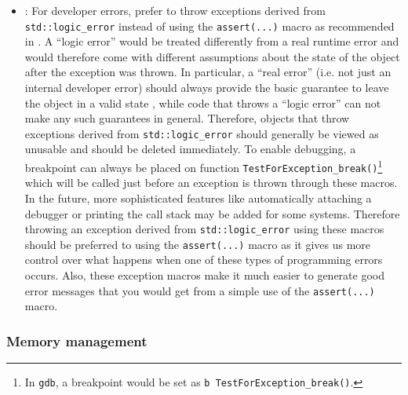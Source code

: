 \begin{itemize}

{}\item\GCGTestForException: For developer errors, prefer to throw exceptions
derived from {}\texttt{std\-::logic\-\_error} instead of using the
{}\texttt{assert(...)}  macro as recommended in {}\cite[Item
68]{C++CodingStandards05}.  A ``logic error'' would be treated differently
from a real runtime error and would therefore come with different assumptions
about the state of the object after the exception was thrown.  In particular,
a ``real error'' (i.e. not just an internal developer error) should always
provide the basic guarantee to leave the object in a valid state {}\cite[Item
71]{C++CodingStandards05}, while code that throws a ``logic error'' can not
make any such guarantees in general.  Therefore, objects that throw exceptions
derived from {}\texttt{std\-::logic\-\_error} should generally be viewed as
unusable and should be deleted immediately.  To enable debugging, a breakpoint
can always be placed on function
{}\texttt{Test\-For\-Exception\-\_break()}\footnote{In {}\texttt{gdb}, a
breakpoint would be set as {}\texttt{b Test\-For\-Exception\-\_break()}.} 
which will be called just before an exception is thrown through these macros.
In the future, more sophisticated features like automatically attaching a
debugger or printing the call stack may be added for some systems.  Therefore
throwing an exception derived from {}\texttt{std\-::logic\-\_error} using
these macros should be preferred to using the {}\texttt{assert(...)} macro as
it gives us more control over what happens when one of these types of
programming errors occurs.  Also, these exception macros make it much easier
to generate good error messages that you would get from a simple use of the
{}\texttt{assert(...)} macro.

\end{itemize}


%
\subsubsection{Memory management}
%

